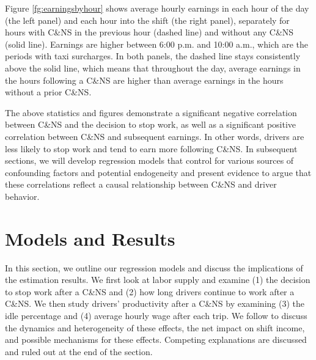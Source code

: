 \documentclass[reviewmode]{restud}
\begin{document}
Figure \ref{fg:earningsbyhour} shows average hourly earnings in each hour of the day (the left panel) and each hour into the shift (the right panel), separately for hours with C\&NS in the previous hour (dashed line) and without any C\&NS (solid line). Earnings are higher between 6:00 p.m. and 10:00 a.m., which are the periods with taxi surcharges. In both panels, the dashed line stays consistently above the solid line, which means that throughout the day, average earnings in the hours following a C\&NS are higher than  average earnings in the hours without a prior C\&NS.

The above statistics and figures demonstrate a significant negative correlation between C\&NS and the decision to stop work, as well as a significant positive correlation between C\&NS and subsequent earnings. In other words, drivers are less likely to stop work and tend to earn more following C\&NS. In subsequent sections, we will develop regression models  that control for various sources of confounding factors and potential endogeneity and present evidence to argue that these correlations reflect a causal relationship between C\&NS and driver behavior.

\section{Models and Results}
In this section, we outline our regression models and discuss the implications of the estimation results. We first look at labor supply and examine (1) the decision to stop work after a C\&NS and (2) how long drivers continue to work after a C\&NS. We then study drivers' productivity after a C\&NS by examining (3) the idle percentage and (4) average hourly wage after each trip. We follow to discuss the dynamics and heterogeneity of these effects, the net impact on shift income, and possible mechanisms for these effects. Competing explanations are discussed and ruled out at the end of the section.
\end{document}

